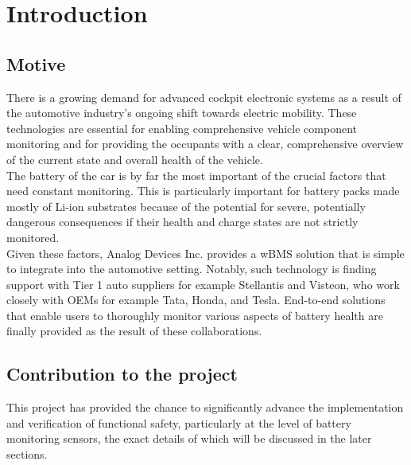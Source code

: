 \chapter{Introduction} %

\label{ch:intro}


\section{Motive}
There is a growing demand for advanced cockpit electronic systems as a result of the automotive industry's ongoing shift towards electric mobility. These technologies are essential for enabling comprehensive vehicle component monitoring and for providing the occupants with a clear, comprehensive overview of the current state and overall health of the vehicle. \\
The battery of the car is by far the most important of the crucial factors that need constant monitoring. This is particularly important for battery packs made mostly of Li-ion substrates because of the potential for severe, potentially dangerous consequences if their health and charge states are not strictly monitored. \\
Given these factors, Analog Devices Inc. provides a wBMS solution that is simple to integrate into the automotive setting. Notably, such technology is finding support with Tier 1 auto suppliers for example Stellantis and Visteon, who work closely with OEMs for example Tata, Honda, and Tesla. End-to-end solutions that enable users to thoroughly monitor various aspects of battery health are finally provided as the result of these collaborations.

\section{Contribution to the project}
This project has provided the chance to significantly advance the implementation and verification of functional safety, particularly at the level of battery monitoring sensors, the exact details of which will be discussed in the later sections. 